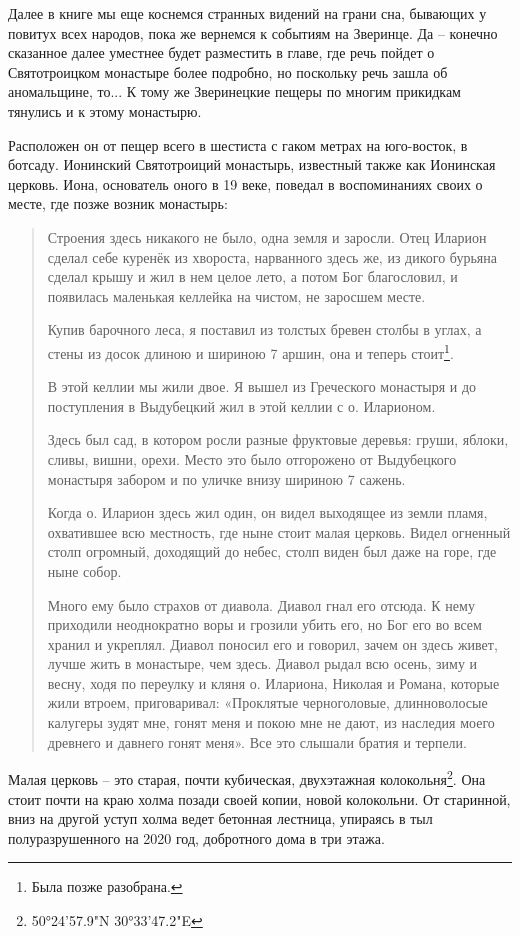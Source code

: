 Далее в книге мы еще коснемся странных видений на грани сна, бывающих у повитух всех народов, пока же вернемся к событиям на Зверинце. Да – конечно сказанное далее уместнее будет разместить в главе, где речь пойдет о Святотроицком монастыре более подробно, но поскольку речь зашла об аномальщине, то... К тому же Зверинецкие пещеры по многим прикидкам тянулись и к этому монастырю.

Расположен он от пещер всего в шестиста с гаком метрах на юго-восток, в ботсаду. Ионинский Святотроиций монастырь, известный также как Ионинская церковь. Иона, основатель оного в 19 веке, поведал в воспоминаниях своих о месте, где позже возник монастырь:

\begin{quotation}
Строения здесь никакого не было, одна земля и заросли. Отец Иларион сделал себе куренёк из хвороста, нарванного здесь же, из дикого бурьяна сделал крышу и жил  в нем целое лето, а потом Бог благословил, и появилась маленькая келлейка на чистом, не заросшем месте. 

Купив барочного леса, я поставил из толстых бревен столбы в углах, а стены из досок длиною и шириною 7 аршин, она и теперь стоит\footnote{Была позже разобрана.}. 

В этой келлии мы жили двое. Я вышел из Греческого монастыря и до поступления в Выдубецкий жил в этой келлии с о. Иларионом.

Здесь был сад, в котором росли разные фруктовые деревья: груши, яблоки, сливы, вишни, орехи. Место это было отгорожено от Выдубецкого монастыря забором и по уличке внизу шириною 7 сажень.

Когда о. Иларион здесь жил один, он видел выходящее из земли пламя, охватившее всю местность, где ныне стоит малая церковь. Видел огненный столп огромный, доходящий до небес, столп виден был даже на горе, где ныне собор.

Много ему было страхов от диавола. Диавол гнал его отсюда. К нему приходили неоднократно  воры и грозили убить его, но Бог его во всем хранил и укреплял. Диавол поносил его и говорил, зачем он здесь живет, лучше жить в монастыре, чем здесь. Диавол рыдал всю осень, зиму и весну, ходя по переулку и кляня о. Илариона, Николая и Романа, которые жили втроем, приговаривал: «Проклятые черноголовые, длинноволосые калугеры зудят мне, гонят меня и покою мне не дают, из наследия моего древнего и давнего гонят меня». Все это слышали братия и терпели.
\end{quotation}

Малая церковь – это старая, почти кубическая, двухэтажная колокольня\footnote{50°24'57.9"N 30°33'47.2"E}. Она стоит почти на краю холма позади своей копии, новой колокольни. От старинной, вниз на другой уступ холма ведет бетонная лестница, упираясь в тыл полуразрушенного на 2020 год, добротного дома в три этажа.

